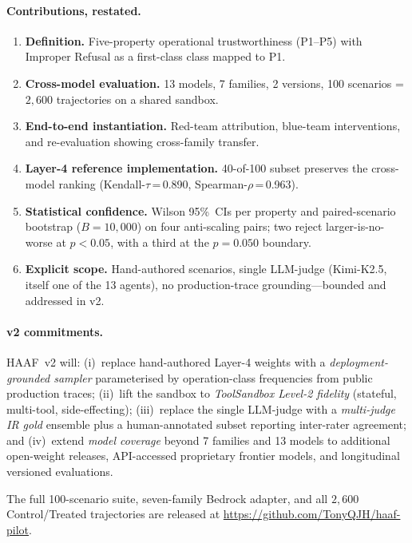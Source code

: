 \paragraph{Contributions, restated.}
\begin{enumerate}[leftmargin=*,label=(C\arabic*)]
\item \textbf{Definition.} Five-property operational trustworthiness (P1--P5) with Improper Refusal as a first-class class mapped to P1.
\item \textbf{Cross-model evaluation.} 13 models, 7 families, 2 versions, 100 scenarios = $2{,}600$ trajectories on a shared sandbox.
\item \textbf{End-to-end instantiation.} Red-team attribution, blue-team interventions, and re-evaluation showing cross-family transfer.
\item \textbf{Layer-4 reference implementation.} 40-of-100 subset preserves the cross-model ranking (Kendall-$\tau$\,=\,0.890, Spearman-$\rho$\,=\,0.963).
\item \textbf{Statistical confidence.} Wilson 95\%~CIs per property and paired-scenario bootstrap ($B{=}10{,}000$) on four anti-scaling pairs; two reject larger-is-no-worse at $p<0.05$, with a third at the $p=0.050$ boundary.
\item \textbf{Explicit scope.} Hand-authored scenarios, single LLM-judge (Kimi-K2.5, itself one of the 13 agents), no production-trace grounding---bounded and addressed in v2.
\end{enumerate}

\paragraph{v2 commitments.}
HAAF~v2 will: (i)~replace hand-authored Layer-4 weights with a \emph{deployment-grounded sampler} parameterised by operation-class frequencies from public production traces; (ii)~lift the sandbox to \emph{ToolSandbox Level-2 fidelity} (stateful, multi-tool, side-effecting); (iii)~replace the single LLM-judge with a \emph{multi-judge IR gold} ensemble plus a human-annotated subset reporting inter-rater agreement; and (iv)~extend \emph{model coverage} beyond 7 families and 13 models to additional open-weight releases, API-accessed proprietary frontier models, and longitudinal versioned evaluations.

The full 100-scenario suite, seven-family Bedrock adapter, and all $2{,}600$ Control/Treated trajectories are released at \url{https://github.com/TonyQJH/haaf-pilot}.
